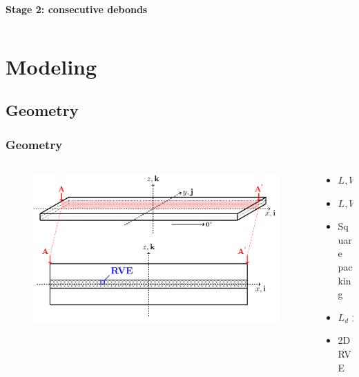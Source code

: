\documentclass[first,firstsupp,lastsupp,last,hyperref,table]{ETHclass}
\begin{document}
\begin{frame}
\begin{columns}
\begin{column}{0.5\textwidth}
\begin{alertblock}{\centering\scriptsize\bf Stage 2: consecutive debonds}
\begin{figure}
\end{figure}
\end{alertblock}
\end{column}
\end{columns}
\end{frame}

\section{Modeling}

\subsection{Geometry}

\begin{frame}
\frametitle{\vspace{0.2cm}\small Geometry}
\vspace{-1cm}
\centering
\begin{columns}[c]
\begin{column}{0.85\textwidth}
\begin{figure}
\centering
\includegraphics[width=\columnwidth]{laminate-section.pdf}
\end{figure}
\end{column}
\begin{column}{0.15\textwidth}
\scriptsize
\begin{itemize}[label=]
\item $L, W >> t$
\item $L, W \rightarrow \infty$
\item Square packing
\item$L_{d} >> \Delta\theta_{d}$
\item 2D RVE
\end{itemize}
\end{column}
\end{columns}
\end{frame}
\end{document}
